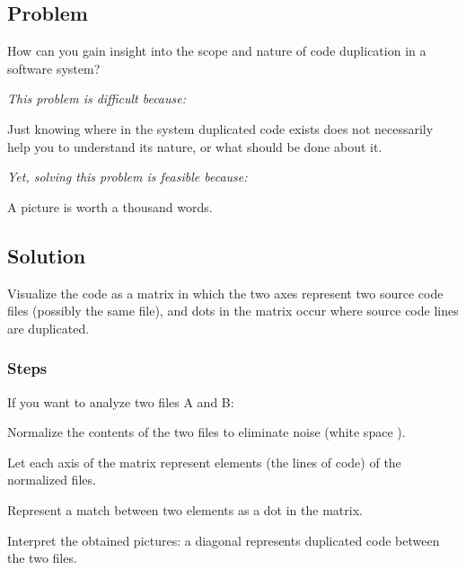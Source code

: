 \documentclass[a4paper,10pt,twoside]{book}
\begin{document}



\subsection*{Problem}

How can you gain insight into the scope and nature of code duplication in a software system?

\emph{This problem is difficult because:} 

\begin{bulletlist}
\item Just knowing where in the system duplicated code exists does not necessarily help you to understand its nature, or what should be done about it.
\end{bulletlist}

\emph{Yet, solving this problem is feasible because:}

\begin{bulletlist}
\item A picture is worth a thousand words.
\end{bulletlist}

\subsection*{Solution}

Visualize the code as a matrix in which the two axes represent two source code files (possibly the same file), and dots in the matrix occur where source code lines are duplicated.

\subsubsection*{Steps}

If you want to analyze two files A and B:

\begin{bulletlist}
\item Normalize the contents of the two files to eliminate noise (white space \etc).

\item Let each axis of the matrix represent elements (\eg the lines of code) of the normalized files.

\item Represent a match between two elements as a dot in the matrix.

\item Interpret the obtained pictures: a diagonal represents duplicated code between the two files.
\end{bulletlist}
\end{document}
